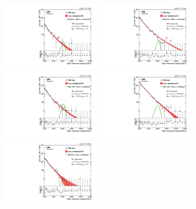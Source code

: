 \begin{figure}[h!]
\centering
\includegraphics[width=0.44\textwidth]{figures/analysis/search1/AN-15-211/fits/MLfits/BkgFit_DijetMassHighPuriWW.pdf}
\includegraphics[width=0.44\textwidth]{figures/analysis/search1/AN-15-211/fits/MLfits/BkgFit_DijetMassLowPuriWW.pdf}\\
\includegraphics[width=0.44\textwidth]{figures/analysis/search1/AN-15-211/fits/MLfits/BkgFit_DijetMassHighPuriWZ.pdf}
\includegraphics[width=0.44\textwidth]{figures/analysis/search1/AN-15-211/fits/MLfits/BkgFit_DijetMassLowPuriWZ.pdf}\\
\includegraphics[width=0.44\textwidth]{figures/analysis/search1/AN-15-211/fits/MLfits/BkgFit_DijetMassHighPuriZZ.pdf}

\end{figure}
